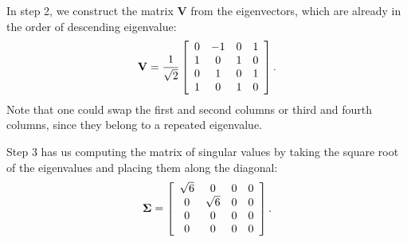 In step 2, we construct the matrix $\mathbf{V}$ from the eigenvectors, which are already in the order of descending eigenvalue:
\begin{align}
  \mathbf{V} = \frac{1}{\sqrt{2}} \left[ \begin{array}{c c c c}
   0 & -1 &  0 &  1 \\
   1 &  0 &  1 &  0 \\
   0 &  1 &  0 &  1 \\
   1 &  0 &  1 &  0 \\ \end{array} \right] .
\end{align}
Note that one could swap the first and second columns or third and fourth columns, since they belong to a repeated eigenvalue.

Step 3 has us computing the matrix of singular values by taking the square root of the eigenvalues and placing them along the diagonal:
\begin{align}
  \boldsymbol\Sigma =  \left[ \begin{array}{c c c c}
   \sqrt{6} &  0 &  0 &  0 \\
   0 &  \sqrt{6} &  0 &  0 \\
   0 &  0 &  0 &  0 \\
   0 &  0 &  0 &  0 \\ \end{array} \right] .
\end{align}


